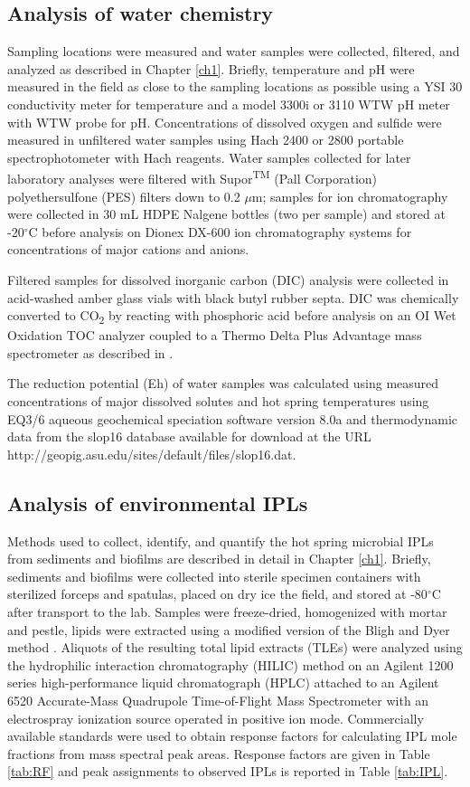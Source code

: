 \subsection{Analysis of water chemistry}
Sampling locations were measured and water samples were collected, filtered, and analyzed as described in Chapter \ref{ch1}. Briefly, temperature and pH were measured in the field as close to the sampling locations as possible using a YSI 30 conductivity meter for temperature and a model 3300i or 3110 WTW pH meter with WTW probe for pH. Concentrations of dissolved oxygen and sulfide were measured in unfiltered water samples using Hach 2400 or 2800 portable spectrophotometer with Hach reagents. Water samples collected for later laboratory analyses were filtered with Supor\textsuperscript{TM} (Pall Corporation) polyethersulfone (PES) filters down to 0.2 $\mu$m; samples for ion chromatography were collected in 30 mL HDPE Nalgene bottles (two per sample) and stored at -20$^{\circ}$C before analysis on Dionex DX-600 ion chromatography systems for concentrations of major cations and anions.

Filtered samples for dissolved inorganic carbon (DIC) analysis were collected in acid-washed amber glass vials with black butyl rubber septa. DIC was chemically converted to CO\textsubscript{2} by reacting with phosphoric acid before analysis on an OI Wet Oxidation TOC analyzer coupled to a Thermo Delta Plus Advantage mass spectrometer as described in \cite{havig2011merging}.

The reduction potential (Eh) of water samples was calculated using measured concentrations of major dissolved solutes and hot spring temperatures using EQ3/6 aqueous geochemical speciation software version 8.0a \citep{wolery2002eq3} and thermodynamic data from the slop16 database available for download at the URL http://geopig.asu.edu/sites/default/files/slop16.dat.

\subsection{Analysis of environmental IPLs} Methods used to collect, identify, and quantify the hot spring microbial IPLs from sediments and biofilms are described in detail in Chapter \ref{ch1}. Briefly, sediments and biofilms were collected into sterile specimen containers with sterilized forceps and spatulas, placed on dry ice the field, and stored at -80$^{\circ}$C after transport to the lab. Samples were freeze-dried, homogenized with mortar and pestle, lipids were extracted using a modified version of the Bligh and Dyer method \citep{white1998signature}. Aliquots of the resulting total lipid extracts (TLEs) were analyzed using the hydrophilic interaction chromatography (HILIC) method \citep{wormer2013application} on an Agilent 1200 series high-performance liquid chromatograph (HPLC) attached to an Agilent 6520 Accurate-Mass Quadrupole Time-of-Flight Mass Spectrometer with an electrospray ionization source operated in positive ion mode. Commercially available standards were used to obtain response factors for calculating IPL mole fractions from mass spectral peak areas. Response factors are given in Table \ref{tab:RF} and peak assignments to observed IPLs is reported in Table \ref{tab:IPL}.

